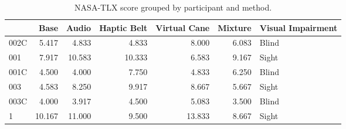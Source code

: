 
\begin{table}[!htb]
\centering
\caption{NASA-TLX score grouped by participant and method.}
\label{tab:nasa_average}
\begin{tabular}{lrrrrrl}
\toprule
{} &   Base &  Audio &  Haptic Belt &  Virtual Cane &  Mixture & Visual Impairment \\
\midrule
002C &  5.417 &  4.833 &        4.833 &         8.000 &    6.083 &             Blind \\
001  &  7.917 & 10.583 &       10.333 &         6.583 &    9.167 &             Sight \\
001C &  4.500 &  4.000 &        7.750 &         4.833 &    6.250 &             Blind \\
003  &  4.583 &  8.250 &        9.917 &         8.667 &    5.667 &             Sight \\
003C &  4.000 &  3.917 &        4.500 &         5.083 &    3.500 &             Blind \\
1    & 10.167 & 11.000 &        9.500 &        13.833 &    8.667 &             Sight \\
\bottomrule
\end{tabular}
\end{table}

